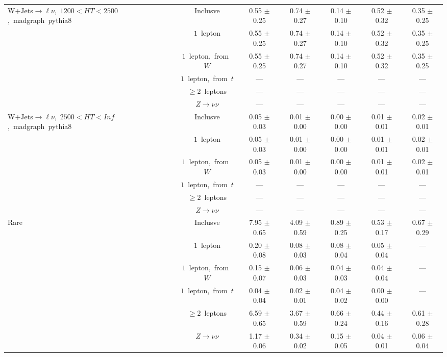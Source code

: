 \documentclass{article}
\begin{document}
\begin{longtable}{|l|c|c|c|c|c|c|}
\hline 
\multirow{6}{*}{W+Jets$\rightarrow\ell\nu$,~$1200<HT<2500$,~madgraph~pythia8} & Inclusve  & 0.55 $\pm$ 0.25  & 0.74 $\pm$ 0.27  & 0.14 $\pm$ 0.10  & 0.52 $\pm$ 0.32  & 0.35 $\pm$ 0.25 \\* 
 & $1$~lepton  & 0.55 $\pm$ 0.25  & 0.74 $\pm$ 0.27  & 0.14 $\pm$ 0.10  & 0.52 $\pm$ 0.32  & 0.35 $\pm$ 0.25 \\* 
 & $1$~lepton,~from~$W$  & 0.55 $\pm$ 0.25  & 0.74 $\pm$ 0.27  & 0.14 $\pm$ 0.10  & 0.52 $\pm$ 0.32  & 0.35 $\pm$ 0.25 \\* 
 & $1$~lepton,~from~$t$  & ---  & ---  & ---  & ---  & --- \\* 
 & $\ge2$~leptons  & ---  & ---  & ---  & ---  & --- \\* 
 & $Z\rightarrow\nu\nu$  & ---  & ---  & ---  & ---  & --- \\* 
\hline 
\multirow{6}{*}{W+Jets$\rightarrow\ell\nu$,~$2500<HT<Inf$,~madgraph~pythia8} & Inclusve  & 0.05 $\pm$ 0.03  & 0.01 $\pm$ 0.00  & 0.00 $\pm$ 0.00  & 0.01 $\pm$ 0.01  & 0.02 $\pm$ 0.01 \\* 
 & $1$~lepton  & 0.05 $\pm$ 0.03  & 0.01 $\pm$ 0.00  & 0.00 $\pm$ 0.00  & 0.01 $\pm$ 0.01  & 0.02 $\pm$ 0.01 \\* 
 & $1$~lepton,~from~$W$  & 0.05 $\pm$ 0.03  & 0.01 $\pm$ 0.00  & 0.00 $\pm$ 0.00  & 0.01 $\pm$ 0.01  & 0.02 $\pm$ 0.01 \\* 
 & $1$~lepton,~from~$t$  & ---  & ---  & ---  & ---  & --- \\* 
 & $\ge2$~leptons  & ---  & ---  & ---  & ---  & --- \\* 
 & $Z\rightarrow\nu\nu$  & ---  & ---  & ---  & ---  & --- \\* 
\hline 
\multirow{6}{*}{Rare} & Inclusve  & 7.95 $\pm$ 0.65  & 4.09 $\pm$ 0.59  & 0.89 $\pm$ 0.25  & 0.53 $\pm$ 0.17  & 0.67 $\pm$ 0.29 \\* 
 & $1$~lepton  & 0.20 $\pm$ 0.08  & 0.08 $\pm$ 0.03  & 0.08 $\pm$ 0.04  & 0.05 $\pm$ 0.04  & --- \\* 
 & $1$~lepton,~from~$W$  & 0.15 $\pm$ 0.07  & 0.06 $\pm$ 0.03  & 0.04 $\pm$ 0.03  & 0.04 $\pm$ 0.04  & --- \\* 
 & $1$~lepton,~from~$t$  & 0.04 $\pm$ 0.04  & 0.02 $\pm$ 0.01  & 0.04 $\pm$ 0.02  & 0.00 $\pm$ 0.00  & --- \\* 
 & $\ge2$~leptons  & 6.59 $\pm$ 0.65  & 3.67 $\pm$ 0.59  & 0.66 $\pm$ 0.24  & 0.44 $\pm$ 0.16  & 0.61 $\pm$ 0.28 \\* 
 & $Z\rightarrow\nu\nu$  & 1.17 $\pm$ 0.06  & 0.34 $\pm$ 0.02  & 0.15 $\pm$ 0.05  & 0.04 $\pm$ 0.01  & 0.06 $\pm$ 0.04 \\* 

\end{longtable}
\end{document}
